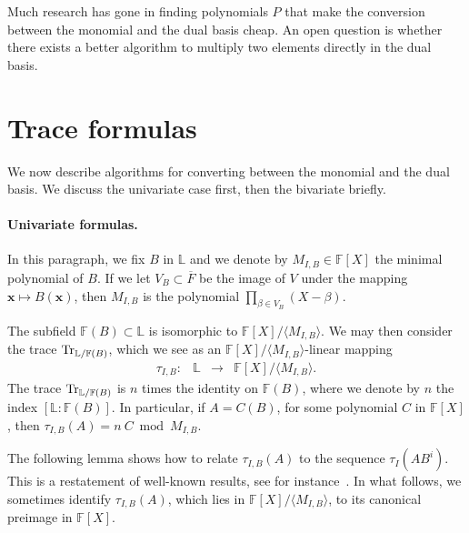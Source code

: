 \documentclass[12pt]{article}
\def\F {\ensuremath{\mathbb{F}}}
\def\L {\ensuremath{\mathbb{L}}}
\def\x {\ensuremath{\mathbf{x}}}
\begin{document}
Much research has gone in finding polynomials $P$ that make the
conversion between the monomial and the dual basis cheap. An open
question is whether there exists a better algorithm to multiply two
elements directly in the dual basis.




\section{Trace formulas} 

We now describe algorithms for converting between the monomial and the
dual basis. We discuss the univariate case first, then the bivariate
briefly.


\paragraph{Univariate formulas.} In this paragraph, we fix $B$ in $\L$ and we 
denote by $M_{I,B} \in \F[X]$ the minimal polynomial of $B$. If we let
$V_B \subset \overline{F}$ be the image of $V$ under the mapping $\x \mapsto
B(\x)$, then $M_{I,B}$ is the polynomial $\prod_{\beta \in
  V_B}(X-\beta)$.

The subfield $\F(B) \subset \L$ is isomorphic to $\F[X]/\langle
M_{I,B} \rangle$. We may then consider the trace
${\rm Tr}_{\L/\F(B)}$, which we see as an $\F[X]/\langle
M_{I,B}\rangle$-linear mapping
$$
\begin{array}{cccc}
\tau_{I,B} :& \L& \to& \F[X]/\langle M_{I,B} \rangle.
\end{array}$$
The trace ${\rm Tr}_{\L/\F(B)}$ is $n$ times the identity on $\F(B)$,
where we denote by $n$ the index $[\L:\F(B)]$. In particular, if
$A=C(B)$, for some polynomial $C$ in $\F[X]$, then $\tau_{I,B}(A)=n
\ C \bmod M_{I,B}$.

The following lemma shows how to relate $\tau_{I,B} (A)$ to the
sequence $\tau_I(A B^i)$. This is a restatement of well-known results,
see for instance~\cite{rouiller99}. In what follows, we sometimes
identify $\tau_{I,B}(A)$, which lies in $\F[X]/\langle M_{I,B} \rangle$,
to its canonical preimage in $\F[X]$.
\end{document}
